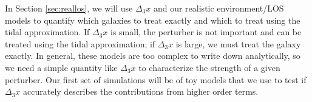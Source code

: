 In Section \ref{sec:reallos}, we will use $\Delta_3 x$ and our realistic environment/LOS models to quantify which galaxies to treat exactly and which to treat using the tidal approximation. If $\Delta_3x$ is small, the perturber is not important and can be treated using the tidal approximation; if $\Delta_3 x$ is large, we must treat the galaxy exactly. In general, these models are too complex to write down analytically, so we need a simple quantity like $\Delta_3 x$ to characterize the strength of a given perturber. Our first set of simulations will be of toy models that we use to test if $\Delta_3 x$ accurately describes the contributions from higher order terms.